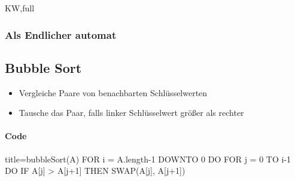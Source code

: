 \documentclass[
    ngerman,
    color=3b,
    dark_mode,
    summary,
    boxarc,
]{rubos-tuda-template}
\begin{document}
\begin{taggedblock}{KW,full}
    \subsubsection{Als Endlicher automat}\label{BOFAStringMatching}
    \begin{figure}[h]
        \centering
        
    \end{figure}
    \clearpage
\end{taggedblock}
%
\subsection{Bubble Sort}\label{BubbleSort}
\begin{idea}\mbox{}
    \begin{itemize}
        \item Vergleiche Paare von benachbarten Schlüsselwerten
        \item Tausche das Paar, falls linker Schlüsselwert größer als rechter
    \end{itemize}
\end{idea}

\paragraph{Code}\mbox{}
\begin{codeBlock}[autogobble]{title=bubbleSort(A)}
    FOR i = A.length-1 DOWNTO 0 DO
        FOR j = 0 TO i-1 DO
            IF A[j] > A[j+1] THEN
                SWAP(A[j], A[j+1])
\end{codeBlock}
\end{document}
